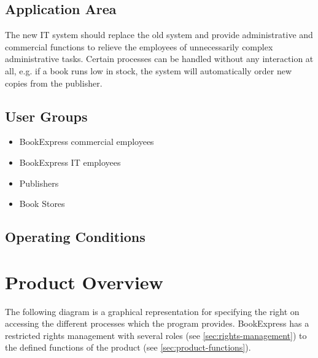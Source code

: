 \documentclass[11pt,a4paper,oneside,svgnames]{report}
\begin{document}
\section{Application Area}
The new IT system should replace the old system and provide administrative and commercial functions to relieve the employees of unnecessarily complex administrative tasks. Certain processes can be handled without any interaction at all, e.g. if a book runs low in stock, the system will automatically order new copies from the publisher.
\section{User Groups}
\begin{itemize}
\item BookExpress commercial employees
\item BookExpress IT employees
\item Publishers
\item Book Stores
\end{itemize}
\section{Operating Conditions}

\chapter{Product Overview}
The following diagram is a graphical representation for specifying the right on accessing the different processes which the program provides.
BookExpress has a restricted rights management with several roles (see \ref{sec:rights-management}) to the defined functions of the product (see \ref{sec:product-functions}).
\end{document}
